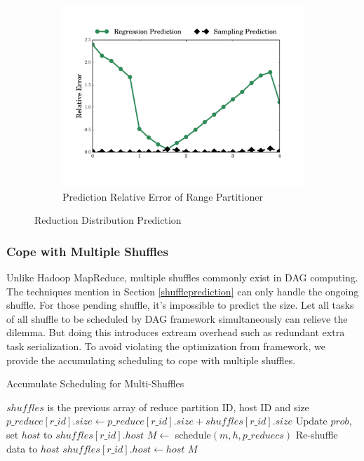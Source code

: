 \begin{figure}
\begin{subfigure}[b]{0.32\linewidth}
		\includegraphics[width=\linewidth]{fig/prediction_relative_error}
		\caption{Prediction Relative Error of Range Partitioner}
		\label{fig:prediction_relative_error}
	\end{subfigure}
	\caption{Reduction Distribution Prediction}
	\label{fig:dis}
\end{figure}
\subsubsection{Cope with Multiple Shuffles}
Unlike Hadoop MapReduce, multiple shuffles commonly exist in DAG computing. The techniques mention in Section \ref{shuffleprediction} can only handle the ongoing shuffle. For those pending shuffle, it's impossible to predict the size. Let all tasks of all shuffle to be scheduled by DAG framework simultaneously can relieve the dilemma. But doing this introduces extream overhead such as redundant extra task serialization. To avoid violating the optimization from framework, we provide the accumulating scheduling to cope with multiple shuffles.
\begin{minipage}{\linewidth}
\begin{algorithm}[H]
\caption{Accumulate Scheduling for Multi-Shuffles}
\label{mhminheap}
	\begin{algorithmic}[1]
	\small
		\State
		\Comment $shuffles$ is the previous array of reduce partition ID, host ID and size
		\State $p\_reduce\left[r\_id\right].size\gets p\_reduce\left[r\_id\right].size + shuffles\left[r\_id\right].size$
		\State Update $prob$, set $host$ to $shuffles\left[r\_id\right].host$
		\EndIf
		\EndFor
		\State $M\gets$ schedule$\left(m, h, p\_reduecs\right)$
				\State Re-shuffle data to $host$
				\State $shuffles\left[r\_id\right].host\gets host$
				\EndIf
			\EndFor
		\EndFor
		\Return $M$
	\EndProcedure
	\end{algorithmic}
\end{algorithm}
\end{minipage}

